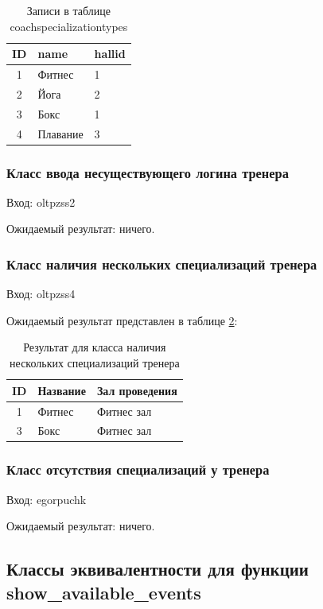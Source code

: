 \begin{table}[H]
	\centering
	\caption{Записи в таблице coachspecializationtypes}
	\begin{tabular}{|c|p{7.5cm}|p{7.5cm}|}
	\hline
	ID & name & hallid \\
	\hline
	1 & Фитнес & 1 \\
	\hline
	2 & Йога & 2 \\
	\hline
	3 & Бокс & 1 \\
	\hline
	4 & Плавание & 3 \\
	\hline
	\end{tabular}
	\label{tab:coachspecializationtypes_db_screen}
\end{table}

\subsubsection{Класс ввода несуществующего логина тренера}

Вход: oltpzss2

Ожидаемый результат: ничего.

\subsubsection{Класс наличия нескольких специализаций тренера}

Вход: oltpzss4

Ожидаемый результат представлен в таблице \ref{tab:res_class_1}:

\begin{table}[H]
	\centering
	\caption{Результат для класса наличия нескольких специализаций тренера}
	\begin{tabular}{|c|p{7.5cm}|p{7.5cm}|}
	\hline
	ID & Название & Зал проведения \\
	\hline
	1 & Фитнес & Фитнес зал \\
	\hline
	3 & Бокс & Фитнес зал \\
	\hline
	\end{tabular}
	\label{tab:res_class_1}
\end{table}

\subsubsection{Класс отсутствия специализаций у тренера}

Вход: egorpuchk

Ожидаемый результат: ничего.

\subsection{Классы эквивалентности для функции show\_available\_events}

